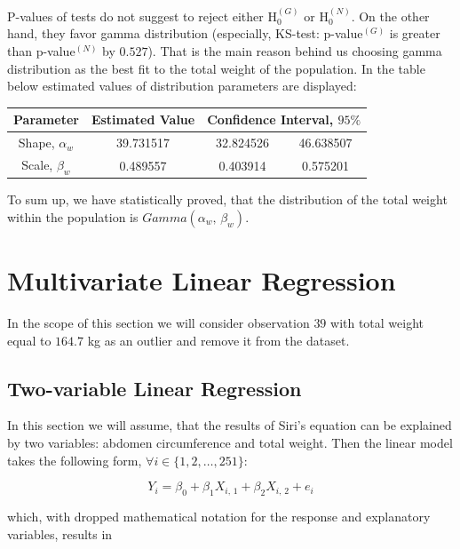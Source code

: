 \documentclass[11pt,american,american]{article}
\begin{document}
P-values of tests do not suggest to reject either $\text{H}_{0}^{(G)}$ or $\text{H}_{0}^{(N)}$. On the other hand, they favor gamma distribution (especially, KS-test: p-value$^{(G)}$ is greater than p-value$^{(N)}$ by $0.527$). That is the main reason behind us choosing gamma distribution as the best fit to the total weight of the population. In the table below estimated values of distribution parameters are displayed:

\begin{table}[ht!]
	\centering
	\begin{tabular}{|c||c||c|c|}
		\hline 
		Parameter &  Estimated Value & \multicolumn{2}{c|}{Confidence Interval, $95\%$}  \\ 
		\hline \hline 
		Shape, $\alpha_{w}$ & 39.731517 & 32.824526 &  46.638507 \\ 
		\cline{1-4}
		Scale, $\beta_{w}$ & 0.489557 & 0.403914 &  0.575201 \\ 
		\hline
	\end{tabular} 
\end{table}

To sum up, we have statistically proved, that the distribution of the total weight within the population is $Gamma(\alpha_{w}, \, \beta_{w})$.


\section{Multivariate Linear Regression}\label{sec:regression}

In the scope of this section we will consider observation $39$ with total weight equal to $164.7$ kg as an outlier and remove it from the dataset.

\subsection{Two-variable Linear Regression}

In this section we will assume, that the results of Siri's equation can be explained by two variables: abdomen circumference and total weight. Then the linear model takes the following form, $\forall i \in \{1,2, \dots, 251\}$:

\begin{equation}
		Y_{i} = \beta_{0} + \beta_{1} X_{i,\,1} + \beta_{2} X_{i,\,2} + e_{i}
\end{equation}

\medskip
\noindent
which, with dropped mathematical notation for the response and explanatory variables, results in
\end{document}
